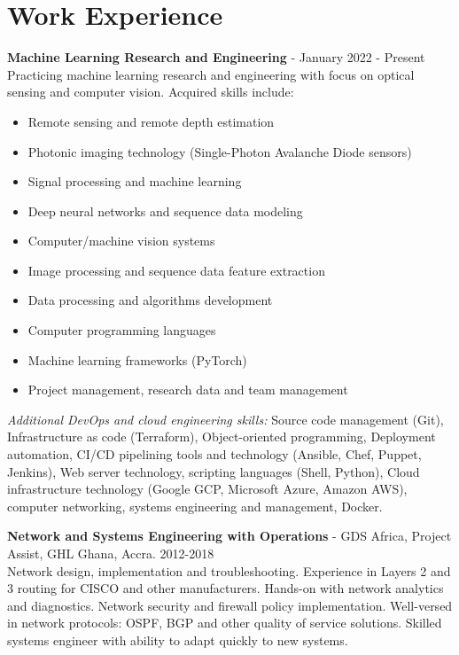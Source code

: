 \documentclass[11pt,a4paper]{article}
\begin{document}
\section*{Work Experience}
\textbf{Machine Learning Research and Engineering} - January 2022 - Present\\
Practicing machine learning research and engineering with focus on optical sensing and computer vision. Acquired skills include:
\begin{itemize}[leftmargin=*,nosep]
    \item Remote sensing and remote depth estimation
    \item Photonic imaging technology (Single-Photon Avalanche Diode sensors)
    \item Signal processing and machine learning
    \item Deep neural networks and sequence data modeling
    \item Computer/machine vision systems
    \item Image processing and sequence data feature extraction
    \item Data processing and algorithms development
    \item Computer programming languages
    \item Machine learning frameworks (PyTorch)
    \item Project management, research data and team management
\end{itemize}
\medskip
\noindent\textit{Additional DevOps and cloud engineering skills:} Source code management (Git), Infrastructure as code (Terraform), Object-oriented programming, Deployment automation, CI/CD pipelining tools and technology (Ansible, Chef, Puppet, Jenkins), Web server technology, scripting languages (Shell, Python), Cloud infrastructure technology (Google GCP, Microsoft Azure, Amazon AWS), computer networking, systems engineering and management, Docker.

\textbf{Network and Systems Engineering with Operations} - GDS Africa, Project Assist, GHL Ghana, Accra. 2012-2018\\
Network design, implementation and troubleshooting. Experience in Layers 2 and 3 routing for CISCO and other manufacturers. Hands-on with network analytics and diagnostics. Network security and firewall policy implementation. Well-versed in network protocols: OSPF, BGP and other quality of service solutions. Skilled systems engineer with ability to adapt quickly to new systems.
\end{document}
